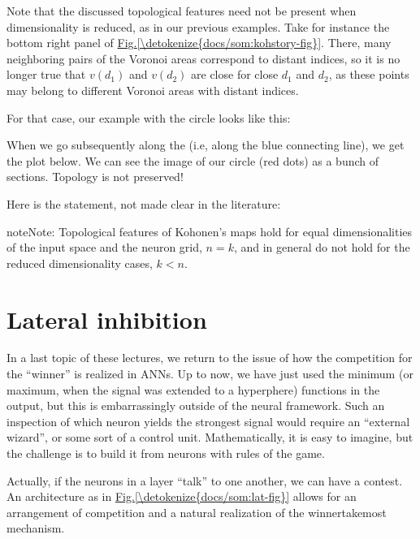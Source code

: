 \documentclass[letterpaper,10pt,english]{jupyterBook}
\begin{document}
\sphinxAtStartPar
Note that the discussed topological features need not be present when dimensionality is reduced, as in our previous examples. Take for instance the bottom right panel of \hyperref[\detokenize{docs/som:kohstory-fig}]{Fig.\@ \ref{\detokenize{docs/som:kohstory-fig}}}. There, many neighboring pairs of the Voronoi areas correspond to distant indices, so it is no longer true that \(v(d_1)\) and \(v(d_2)\) are close for close \(d_1\) and \(d_2\), as these points may belong to different Voronoi areas with distant indices.

\sphinxAtStartPar
For that case, our example with the circle looks like this:

\noindent{}

\sphinxAtStartPar
When we go subsequently along the  (i.e, along the blue connecting line), we get the plot below. We can see the image of our circle (red dots) as a bunch of  sections. Topology is not preserved!

\noindent{}

\sphinxAtStartPar
Here is the statement, not made clear in the literature:

\begin{sphinxadmonition}{note}{Note:}
\sphinxAtStartPar
Topological features of Kohonen’s maps hold for equal dimensionalities of the input space and the neuron grid, \(n=k\), and in general do not hold for the reduced dimensionality cases, \(k<n\).
\end{sphinxadmonition}


\section{Lateral inhibition}
\label{\detokenize{docs/som:lateral-inhibition}}\label{\detokenize{docs/som:lat-lab}}
\sphinxAtStartPar
In a last topic of these lectures, we return to the issue of how the competition for the “winner” is realized in ANNs. Up to now, we have just used the minimum (or maximum, when the signal was extended to a hyperphere) functions in the output, but this is embarrassingly outside of the neural framework. Such an inspection of which neuron yields the strongest signal would require an “external wizard”, or some sort of a control unit. Mathematically, it is easy to imagine, but the challenge is to build it from neurons with rules of the game.

\sphinxAtStartPar
Actually, if the neurons in a layer “talk” to one another, we can have a contest. An architecture as in \hyperref[\detokenize{docs/som:lat-fig}]{Fig.\@ \ref{\detokenize{docs/som:lat-fig}}} allows for an arrangement of competition and a natural realization of the winner\sphinxhyphen{}take\sphinxhyphen{}most mechanism.
\end{document}
